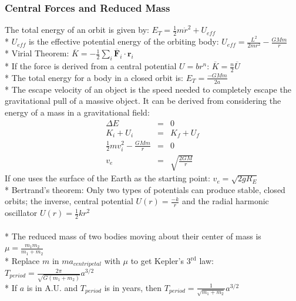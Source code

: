 \subsubsection{Central Forces and Reduced Mass}
The total energy of an orbit is given by: \(E_T=\frac{1}{2}m\dot{r}^2+U_{eff}\)\\*
\(U_{eff}\) is the effective potential energy of the orbiting body: \(U_{eff}=\frac{L^2}{2mr^2}-\frac{GMm}{r}\)\\*
Virial Theorem: \(\overline{K}=-\frac{1}{2}\overline{\sum_i \mathbf{F}_i\cdot \mathbf{r}_i}\)\\*
If the force is derived from a central potential \(U=br^n\): \(\overline{K}=\frac{n}{2}\overline{U}\)\\*
The total energy for a body in a closed orbit is: \(E_T=\frac{-GMm}{2a}\)\\*
The escape velocity of an object is the speed needed to completely escape the gravitational pull of a massive object.
It can be derived from considering the energy of a mass in a gravitational field:
\begin{eqnarray}
\Delta E&=&0 \nonumber \\
K_i+U_i&=&K_f+U_f\nonumber\\
\frac{1}{2}mv_i^2-\frac{GMm}{r}&=&0\nonumber\\
v_e&=&\sqrt{\frac{2GM}{r}}\nonumber
\end{eqnarray}
If one uses the surface of the Earth as the starting point: \(v_e=\sqrt{2gR_E}\)\\*
Bertrand's theorem: Only two types of potentials can produce stable, closed orbits; the inverse, central potential \(U(r)=\frac{-k}{r}\) and the radial harmonic oscillator \(U(r)=\frac{1}{2}kr^2\)\\\\*
The reduced mass of two bodies moving about their center of mass is \(\mu=\frac{m_1m_2}{m_1+m_2}\)\\*
Replace \(m\) in \(ma_{centripetal}\) with \(\mu\) to get Kepler's 3$^{\mathrm{rd}}$ law: \(T_{period}=\frac{2\pi}{\sqrt{G(m_1+m_2)}}a^{3/2}\)\\*
If \(a\) is in A.U. and \(T_{period}\) is in years, then \(T_{period}=\frac{1}{\sqrt{m_1+m_2}}a^{3/2}\)

